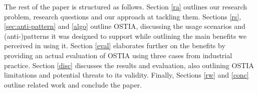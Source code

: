The rest of the paper is structured as follows. Section \ref{ra} outlines our research problem, research questions and our approach at tackling them. Sections \ref{rs}, \ref{sec:anti-pattern} and \ref{algo} outline OSTIA, discussing the usage scenarios and (anti-)patterns it was designed to support while outlining the main benefits we perceived in using it. Section \ref{eval} elaborates further on the benefits by providing an actual evaluation of OSTIA using three cases from industrial practice. Section \ref{disc} discusses the results and evaluation, also outlining OSTIA limitations and potential threats to its validity. Finally, Sections \ref{rw} and \ref{conc} outline related work and conclude the paper.